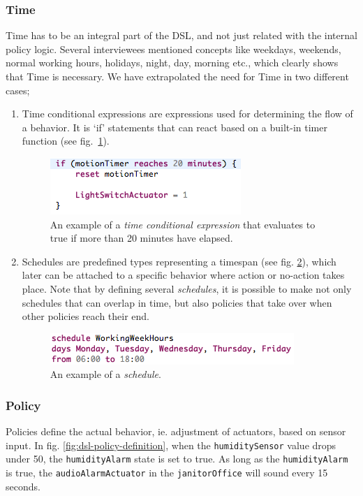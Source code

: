 \subsubsection{Time}\label{subsec:time}
Time has to be an integral part of the DSL, and not just related with the internal policy logic. Several interviewees mentioned concepts like weekdays, weekends, normal working hours, holidays, night, day, morning etc., which clearly shows that Time is necessary. We have extrapolated the need for Time in two different cases;
\begin{enumerate}
	\item Time conditional expressions\label{subsubsec:conditionalexpression}
are expressions used for determining the flow of a behavior. It is `if' statements that can react based on a built-in timer function (see fig.~\ref{fig:dsl-conditionalexpression}).

\begin{figure}[h]
  \centering
    \includegraphics[scale=.5]{dsl-conditional-time-expression.png}
	\caption{An example of a \textit{time conditional expression} that evaluates to true if more than 20 minutes have elapsed.}
	\label{fig:dsl-conditionalexpression}
\end{figure}
\newpage
\item Schedules\label{subsubsec:schedules} are predefined types representing a timespan (see fig. \ref{fig:dsl-schedules}), which later can be attached to a specific behavior where action or no-action takes place. Note that by defining several \textit{schedules}, it is possible to make not only schedules that can overlap in time, but also policies that take over when other policies reach their end.

\begin{figure}
  \centering
  \includegraphics[scale=.5]{dsl-schedules.png}
  \caption{An example of a \textit{schedule}.}
  \label{fig:dsl-schedules}
\end{figure}
\end{enumerate}

\subsubsection{Policy}\label{subsec:policies}
Policies define the actual behavior, ie. adjustment of actuators, based on sensor input. In fig. \ref{fig:dsl-policy-definition}, when the \texttt{humiditySensor} value drops under 50, the \texttt{humidityAlarm} state is set to true. As long as the \texttt{humidityAlarm} is true, the \texttt{audioAlarmActuator} in the \texttt{janitorOffice} will sound every 15 seconds.

